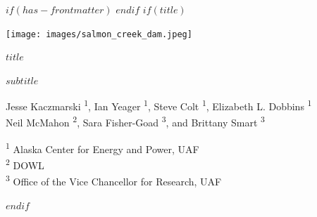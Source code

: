 
$if(has-frontmatter)$
\frontmatter
$endif$
$if(title)$
\cleardoublepage
\thispagestyle{empty}
{\centering

\vspace*{-3cm}


\vspace{3ex}

\par\noindent\hspace*{-1cm}\texttt{[image: images/salmon\_creek\_dam.jpeg]}

\vspace{3ex}


{\huge\bfseries\color{uafblue} $title$ \par}
\vspace{2ex}
{\large\bfseries\color{uafblue} $subtitle$ \par}

\vspace{3ex}

{\normalsize
  Jesse Kaczmarski \textsuperscript{1}, 
  Ian Yeager \textsuperscript{1}, 
  Steve Colt \textsuperscript{1},
  Elizabeth L. Dobbins \textsuperscript{1}\\
  Neil McMahon \textsuperscript{2}, 
  Sara Fisher-Goad \textsuperscript{3}, and 
  Brittany Smart \textsuperscript{3} 
}

\vspace{5ex}

{\normalsize
  \textsuperscript{1} Alaska Center for Energy and Power, UAF \\
  \textsuperscript{2} DOWL \\
  \textsuperscript{3} Office of the Vice Chancellor for Research, UAF
}


}
$endif$


